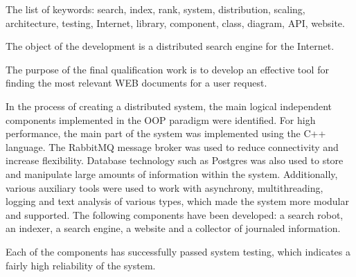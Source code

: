 The list of keywords: search, index, rank, system, distribution, scaling, architecture, testing, Internet, library, component, class, diagram, API, website.

The object of the development is a distributed search engine for the Internet.

The purpose of the final qualification work is to develop an effective tool for finding the most relevant WEB documents for a user request.

In the process of creating a distributed system, the main logical independent components implemented in the OOP paradigm were identified. For high performance, the main part of the system was implemented using the C++ language. The RabbitMQ message broker was used to reduce connectivity and increase flexibility. Database technology such as Postgres was also used to store and manipulate large amounts of information within the system. Additionally, various auxiliary tools were used to work with asynchrony, multithreading, logging and text analysis of various types, which made the system more modular and supported. The following components have been developed: a search robot, an indexer, a search engine, a website and a collector of journaled information.

Each of the components has successfully passed system testing, which indicates a fairly high reliability of the system.
